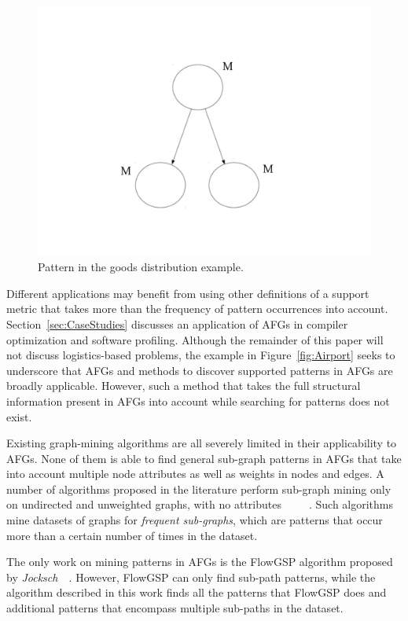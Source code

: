 \begin{figure}[h!]
\centering
   \includegraphics[scale=0.1]{figures/figure3.pdf}
    \caption{Pattern in the goods distribution example.}
    \label{fig:Pattern}  
\end{figure}

Different applications may benefit from using other definitions of a support metric that takes more than the frequency of pattern occurrences into account. Section~\ref{sec:CaseStudies} discusses an application of AFGs in compiler optimization and software profiling. Although the remainder of this paper will not discuss logistics-based problems, the example in Figure~\ref{fig:Airport} seeks to underscore that AFGs and methods to discover supported patterns in AFGs are broadly applicable. However, such a method that takes the full structural information present in AFGs into account while searching for patterns does not exist.

Existing graph-mining algorithms are all severely limited in their applicability to AFGs. None of them is able to find general sub-graph patterns in AFGs that take into account multiple node attributes as well as weights in nodes and edges. A number of algorithms proposed in the literature perform sub-graph mining only on undirected and unweighted graphs, with no attributes~\cite{gSpan}~\cite{Gaston}~\cite{FFSM}~\cite{FSP}~\cite{AGM}. Such algorithms mine datasets of graphs for \emph{frequent sub-graphs}, which are patterns that occur more than a certain number of times in the dataset. 

The only work on mining patterns in AFGs is the FlowGSP algorithm proposed by \emph{Jocksch~\etal}~\cite{FlowGSP}. However, FlowGSP can only find sub-path patterns, while the algorithm described in this work finds all the patterns that FlowGSP does and additional patterns that encompass multiple sub-paths in the dataset.  

